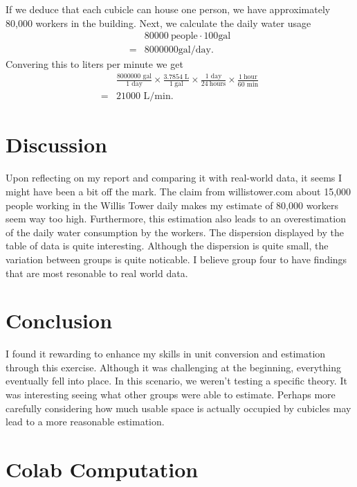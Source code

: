 \documentclass{report}
\begin{document}
    If we deduce that each cubicle can house one person, we have approximately 80,000 workers in the building.
    \bigbreak \noindent 
    Next, we calculate the daily water usage
    \begin{align*}
        &80000\ \text{people} \cdot 100\text{gal} \\
        =&8000000 \text{gal}/\text{day}
    .\end{align*}
    Convering this to liters per minute we get
    \begin{align*}
        &\frac{8000000 \text{ gal}}{\text{1 day}} \times \frac{3.7854 \text{ L}}{1\ \text{gal}}\times \frac{1 \text{ day}}{24\ \text{hours}} \times \frac{1\ \text{hour}}{60 \text{ min}} \\
        =&21000\text{ L}/\text{min}
    .\end{align*}

    \bigbreak \noindent 
    \section{Discussion}
    \bigbreak \noindent 
    Upon reflecting on my report and comparing it with real-world data, it seems I might have been a bit off the mark. The claim from willistower.com about 15,000 people working in the Willis Tower daily makes my estimate of 80,000 workers seem way too high. Furthermore, this estimation also leads to an overestimation of the daily water consumption by the workers. 
    \bigbreak \noindent 
    The dispersion displayed by the table of data is quite interesting. Although the dispersion is quite small, the variation between groups is quite noticable. I believe group four to have findings that are most resonable to real world data.

    \bigbreak \noindent 
    \section{Conclusion}
    \bigbreak \noindent 
    I found it rewarding to enhance my skills in unit conversion and estimation through this exercise. Although it was challenging at the beginning, everything eventually fell into place. In this scenario, we weren't testing a specific theory. It was interesting seeing what other groups were able to estimate. Perhaps more carefully considering how much usable space is actually occupied by cubicles may lead to a more reasonable estimation. 

    \pagebreak 
    \section{Colab Computation}
    \bigbreak \noindent 
\end{document}

